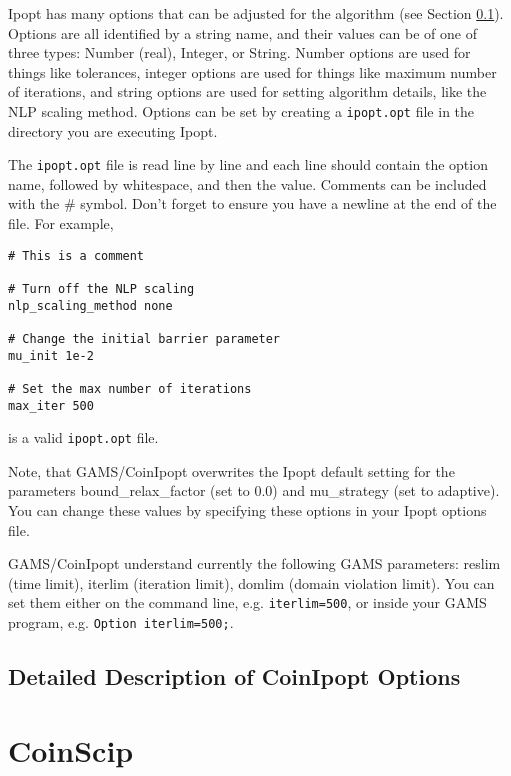 Ipopt has many options that can be adjusted for the algorithm (see Section \ref{sub:ipoptoptions}).
Options are all identified by a string name, and their values can be of one of three types: Number (real), Integer, or String.
Number options are used for things like tolerances, integer options are used for things like maximum number of iterations, and string options are used for setting algorithm details, like the NLP scaling method.
Options can be set by creating a \texttt{ipopt.opt} file in the directory you are executing Ipopt.

The \texttt{ipopt.opt} file is read line by line and each line should contain the option name, followed by whitespace, and then the value.
Comments can be included with the \# symbol. Don't forget to ensure you have a newline at the end of the file. For example,
\begin{verbatim}
# This is a comment

# Turn off the NLP scaling
nlp_scaling_method none

# Change the initial barrier parameter
mu_init 1e-2

# Set the max number of iterations
max_iter 500
\end{verbatim}
is a valid \texttt{ipopt.opt} file.


Note, that GAMS/CoinIpopt overwrites the Ipopt default setting for the parameters bound\_relax\_factor (set to 0.0) and mu\_strategy (set to adaptive).
You can change these values by specifying these options in your Ipopt options file.

GAMS/CoinIpopt understand currently the following GAMS parameters: reslim (time limit), iterlim (iteration limit), domlim (domain violation limit).
You can set them either on the command line, e.g. \verb+iterlim=500+, or inside your GAMS program, e.g. \verb+Option iterlim=500;+.

\subsection{Detailed Description of CoinIpopt Options}
\label{sub:ipoptoptions}



\section{CoinScip}

